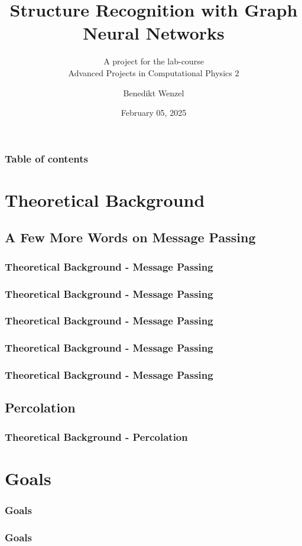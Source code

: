 \documentclass{beamer}
\title{Structure Recognition with Graph Neural Networks}
\subtitle{A project for the lab-course \\Advanced Projects in Computational Physics 2 }
\date{February 05, 2025}
\author{Benedikt Wenzel}
\begin{document}
\begin{frame}[plain]
\hspace*{-0.7cm}
\begin{minipage}{\textwidth}
    \titlepage    
\end{minipage}
\end{frame}

\begin{frame}
    \frametitle{Table of contents}
    \tableofcontents
\end{frame}

\section{Theoretical Background}
\subsection{A Few More Words on Message Passing}
\begin{frame}
    \frametitle{Theoretical Background - Message Passing}
    
\end{frame}
\begin{frame}
    \frametitle{Theoretical Background - Message Passing}
    
\end{frame}
\begin{frame}
    \frametitle{Theoretical Background - Message Passing}
    
\end{frame}
\begin{frame}
    \frametitle{Theoretical Background - Message Passing}
    
\end{frame}
\begin{frame}
    \frametitle{Theoretical Background - Message Passing}
    
\end{frame}

\subsection{Percolation}
\begin{frame}
    \frametitle{Theoretical Background - Percolation}
    
\end{frame}

\section{Goals}
\begin{frame}
    \frametitle{Goals}
    
\end{frame}
\begin{frame}
    \frametitle{Goals}
    
\end{frame}
\end{document}
